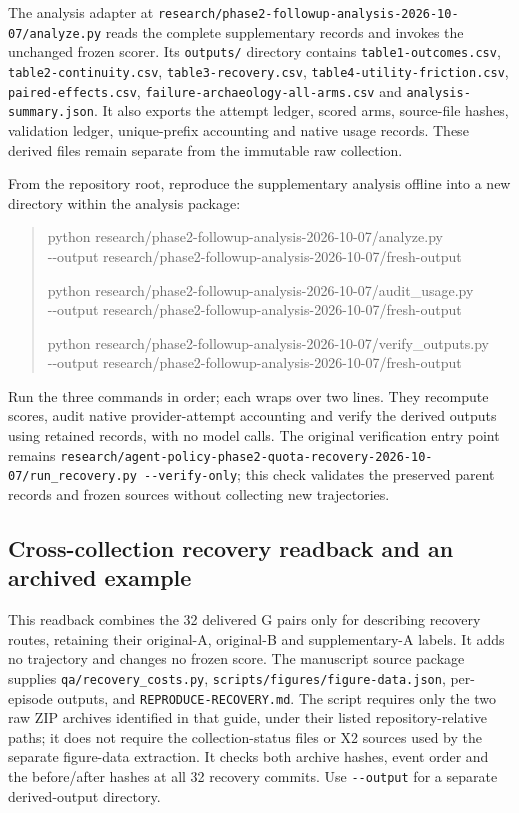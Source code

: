 \documentclass[11pt,a4paper]{article}
\newcommand{\code}[1]{\nolinkurl{#1}}
\begin{document}
The analysis adapter at \code{research/phase2-followup-analysis-2026-10-07/analyze.py} reads the complete supplementary records and invokes the unchanged frozen scorer. Its \code{outputs/} directory contains \code{table1-outcomes.csv}, \code{table2-continuity.csv}, \code{table3-recovery.csv}, \code{table4-utility-friction.csv}, \code{paired-effects.csv}, \code{failure-archaeology-all-arms.csv} and \code{analysis-summary.json}. It also exports the attempt ledger, scored arms, source-file hashes, validation ledger, unique-prefix accounting and native usage records. These derived files remain separate from the immutable raw collection.

From the repository root, reproduce the supplementary analysis offline into a new directory within the analysis package:
\begin{quote}\small\ttfamily
python research/phase2-followup-analysis-2026-10-07/analyze.py\\
\hspace*{1em}-{}-output research/phase2-followup-analysis-2026-10-07/fresh-output
\par\medskip
python research/phase2-followup-analysis-2026-10-07/audit\_usage.py\\
\hspace*{1em}-{}-output research/phase2-followup-analysis-2026-10-07/fresh-output
\par\medskip
python research/phase2-followup-analysis-2026-10-07/verify\_outputs.py\\
\hspace*{1em}-{}-output research/phase2-followup-analysis-2026-10-07/fresh-output
\end{quote}
Run the three commands in order; each wraps over two lines. They recompute scores, audit native provider-attempt accounting and verify the derived outputs using retained records, with no model calls. The original verification entry point remains \code{research/agent-policy-phase2-quota-recovery-2026-10-07/run_recovery.py --verify-only}; this check validates the preserved parent records and frozen sources without collecting new trajectories.

\subsection{Cross-collection recovery readback and an archived example}
\label{app:recovery-readback}
This readback combines the 32 delivered G pairs only for describing recovery routes, retaining their original-A, original-B and supplementary-A labels. It adds no trajectory and changes no frozen score. The manuscript source package supplies \code{qa/recovery_costs.py}, \code{scripts/figures/figure-data.json}, per-episode outputs, and \code{REPRODUCE-RECOVERY.md}. The script requires only the two raw ZIP archives identified in that guide, under their listed repository-relative paths; it does not require the collection-status files or X2 sources used by the separate figure-data extraction. It checks both archive hashes, event order and the before/after hashes at all 32 recovery commits. Use \code{--output} for a separate derived-output directory.
\end{document}
